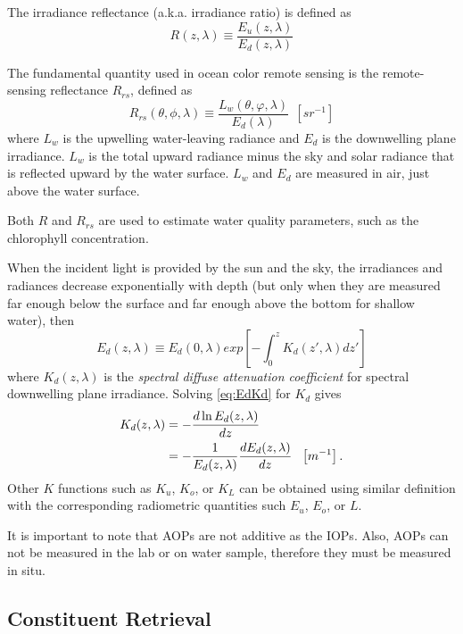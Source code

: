 The irradiance reflectance (a.k.a. irradiance ratio) is defined as
\begin{equation}
  R(z,\lambda)\equiv \frac{E_u(z,\lambda)}{E_d(z,\lambda)}
\end{equation}

The fundamental quantity used in ocean color remote sensing is the remote-sensing reflectance $R_{rs}$, defined as
\begin{equation}
  R_{rs}(\theta,\phi,\lambda)\equiv \frac{L_w(\theta,\varphi,\lambda)}{E_d(\lambda)}~~\left[sr^{-1} \right]
\end{equation}
where $L_w$ is the upwelling water-leaving radiance and $E_d$ is the downwelling plane irradiance. $L_w$ is the total upward radiance minus the sky and solar radiance that is reflected upward by the water surface. $L_w$ and $E_d$ are measured in air, just above the water surface.

Both $R$ and $R_{rs}$ are used to estimate water quality parameters, such as the chlorophyll concentration.

When the incident light is provided by the sun and the sky, the irradiances and radiances decrease exponentially with depth (but only when they are measured far enough below the surface and far enough above the bottom for shallow water), then
\begin{equation}\label{eq:EdKd}
  E_d(z,\lambda)\equiv E_d(0,\lambda) exp\left[-\int_0^{z}K_d(z',\lambda)dz'\right]
\end{equation}
where $K_d(z,\lambda)$ is the {\it spectral diffuse attenuation coefficient} for spectral downwelling plane irradiance. Solving \autoref{eq:EdKd} for $K_d$ gives
\begin{align}
  K_d(z,\lambda)  &=- \frac{d\ln E_d(z,\lambda)}{dz} \notag \\
          &=-\frac{1}{E_d(z,\lambda)}\frac{dE_d(z,\lambda)}{dz} ~~\left[m^{-1} \right].
\end{align}
Other $K$ functions such as $K_u$, $K_o$, or $K_L$ can be obtained using similar definition with the corresponding radiometric quantities such $E_u$, $E_o$, or $L$.

It is important to note that AOPs are not additive as the IOPs. Also, AOPs can not be measured in the lab or on water sample, therefore they must be measured in situ.

\subsection{Constituent Retrieval}

